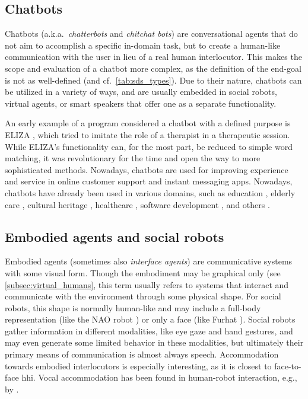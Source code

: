 \subsection{Chatbots}
\label{subsec:chatbots}

Chatbots (a.k.a.\ \emph{chatterbots} and \emph{chitchat bots}) are conversational agents that do not aim to accomplish a specific in-domain task, but to create a human-like communication with the user in lieu of a real human interlocutor.
This makes the scope and evaluation of a chatbot more complex, as the definition of the end-goal is not as well-defined (and cf.\ \cref{tab:sds_types}).
Due to their nature, chatbots can be utilized in a variety of ways, and are usually embedded in social robots, virtual agents, or smart speakers that offer one as a separate functionality.

An early example of a program considered a chatbot with a defined purpose is ELIZA \citep{Weizenbaum1966eliza}, which tried to imitate the role of a therapist in a therapeutic session.
While ELIZA's functionality can, for the most part, be reduced to simple word matching, it was revolutionary for the time and open the way to more sophisticated methods.
Nowadays, chatbots are used for improving experience and service in online customer support and instant messaging apps.
Nowadays, chatbots have already been used in various domains, such as education \citep{Benotti2014engaging, Kerly2007bringing}, elderly care \citep{Iio2020twin}, cultural heritage \citep{Pilato2005expert}, healthcare \citep{Kowatsch2017text}, software development \citep{Lebeuf2017software}, and others \citep{Shawar2007chatbots}.

\subsection{Embodied agents and social robots}
\label{subsec:embodied_agents}

Embodied agents (sometimes also \emph{interface agents}) are communicative systems with some visual form.
Though the embodiment may be graphical only (see \cref{subsec:virtual_humans}, this term usually refers to systems that interact and communicate with the environment through some physical shape.
For social robots, this shape is normally human-like and may include a full-body representation (like the NAO robot \citep{Singh2016nao}) or only a face (like Furhat \citep{AlMoubayed2012furhat}).
Social robots gather information in different modalities, like eye gaze and hand gestures, and may even generate some limited behavior in these modalities, but ultimately their primary means of communication is almost always speech.
Accommodation towards embodied interlocutors is especially interesting, as it is closest to face-to-face \ac{hhi}.
Vocal accommodation has been found in human-robot interaction, e.g., by \citet{Ibrahim2019fundamental}.

